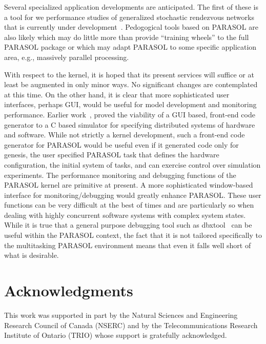 \documentclass[11pt]{article}
\begin{document}
Several specialized application developments are anticipated. The first of these is a tool for
we performance studies of generalized stochastic rendezvous networks that is currently under
development~\cite{woodside-srvn}. Pedogogical tools based on PARASOL are also likely which may do little more
than provide ``training wheels'' to the full PARASOL package or which may adapt PARASOL to
some specific application area, e.g., massively parallel processing.

With respect to the kernel, it is hoped that its present services will suffice or at least be augmented
in only minor ways. No significant changes are contemplated at this time. On the other hand, it is
clear that more sophisticated user interfaces, perhaps GUI, would be useful for model development
and monitoring performance. Earlier work~\cite{brauen-models}, proved the viability of a GUI based, front-end
code generator to a C based simulator for specifying distributed systems of hardware and software.
While not strictly a kernel development, such a front-end code generator for PARASOL would be
useful even if it generated code only for genesis, the user specified PARASOL task that defines the
hardware configuration, the initial system of tasks, and can exercise control over simulation
experiments. The performance monitoring and debugging functions of the PARASOL kernel are
primitive at present. A more sophisticated window-based interface for monitoring/debugging
would greatly enhance PARASOL. These user functions can be very difficult at the best of times
and are particularly so when dealing with highly concurrent software systems with complex system
states.  While it is true that a general purpose debugging tool such as dbxtool~\cite{sun-dbx} can be useful
within the PARASOL context, the fact that it is not tailored specifically to the multitasking
PARASOL environment means that even it falls well short of what is desirable.

\section*{Acknowledgments}

This work was supported in part by the Natural Sciences and Engineering Research Council of
Canada (NSERC) and by the Telecommunications Research Institute of Ontario (TRIO) whose
support is gratefully acknowledged.



\end{document}
